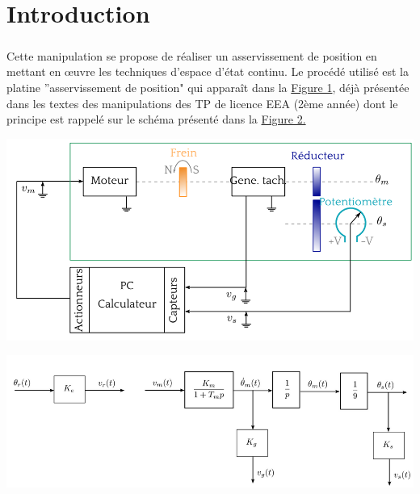\chapter*{Introduction}
	\paragraph{}
		Cette manipulation se propose de réaliser un asservissement de position en mettant en œuvre les techniques d’espace d’état continu. Le procédé utilisé est la platine ”asservissement de position" qui apparaît dans la \hyperref[fig1]{Figure 1}, déjà présentée dans les textes des manipulations des TP de licence EEA (2ème année) dont le principe est rappelé sur le schéma présenté dans la \hyperref[fig2]{Figure 2.}

	\begin{center}
	\includegraphics[scale=0.4]{schemamotor.png}
	\label{fig1} 
	\end{center} 
	
	\begin{center}
	\includegraphics[scale=0.4]{schemablocmotor.png}
	\label{fig2} 
	\end{center}
	
